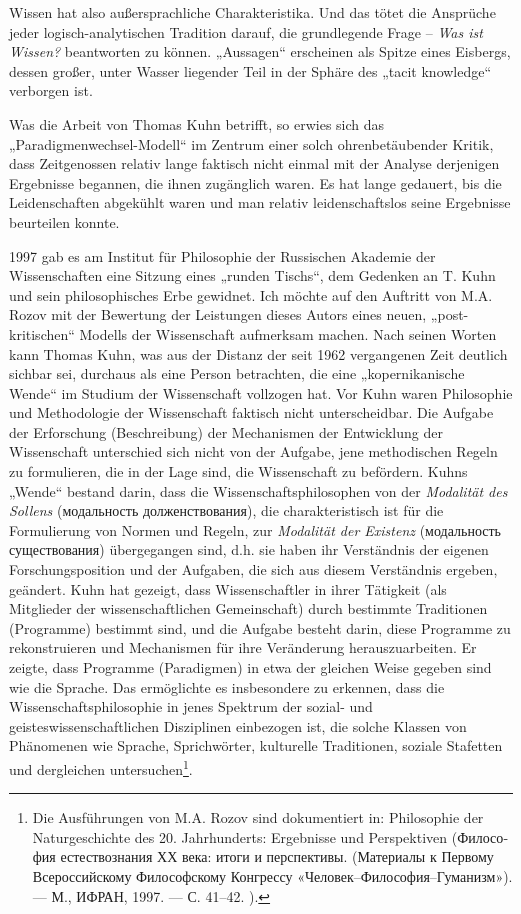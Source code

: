 \documentclass[11pt,a4paper]{article}
\begin{document}
Wissen hat also außersprachliche Charakteristika. Und das tötet die Ansprüche
jeder logisch-analytischen Tradition darauf, die grundlegende Frage --
\emph{Was ist Wissen?} beantworten zu können.  „Aussagen“ erscheinen als
Spitze eines Eisbergs, dessen großer, unter Wasser liegender Teil in der
Sphäre des „tacit knowledge“ verborgen ist.

Was die Arbeit von Thomas Kuhn betrifft, so erwies sich das
„Paradigmenwechsel-Modell“ im Zentrum einer solch ohrenbetäubender Kritik,
dass Zeitgenossen relativ lange faktisch nicht einmal mit der Analyse
derjenigen Ergebnisse begannen, die ihnen zugänglich waren.  Es hat lange
gedauert, bis die Leidenschaften abgekühlt waren und man relativ
leidenschaftslos seine Ergebnisse beurteilen konnte.

1997 gab es am Institut für Philosophie der Russischen Akademie der
Wissenschaften eine Sitzung eines „runden Tischs“, dem Gedenken an T. Kuhn und
sein philosophisches Erbe gewidnet. Ich möchte auf den Auftritt von M.A. Rozov
mit der Bewertung der Leistungen dieses Autors eines neuen, „post-kritischen“
Modells der Wissenschaft aufmerksam machen. Nach seinen Worten kann Thomas
Kuhn, was aus der Distanz der seit 1962 vergangenen Zeit deutlich sichbar sei,
durchaus als eine Person betrachten, die eine „kopernikanische Wende“ im
Studium der Wissenschaft vollzogen hat. Vor Kuhn waren Philosophie und
Methodologie der Wissenschaft faktisch nicht unterscheidbar. Die Aufgabe der
Erforschung (Beschreibung) der Mechanismen der Entwicklung der Wissenschaft
unterschied sich nicht von der Aufgabe, jene methodischen Regeln zu
formulieren, die in der Lage sind, die Wissenschaft zu befördern. Kuhns
„Wende“ bestand darin, dass die Wissenschaftsphilosophen von der
\emph{Modalität des Sollens} (\foreignlanguage{russian}{модальность
  долженствования}), die charakteristisch ist für die Formulierung von Normen
und Regeln, zur \emph{Modalität der Existenz}
(\foreignlanguage{russian}{модальность существования}) übergegangen sind,
d.h. sie haben ihr Verständnis der eigenen Forschungsposition und der
Aufgaben, die sich aus diesem Verständnis ergeben, geändert. Kuhn hat gezeigt,
dass Wissenschaftler in ihrer Tätigkeit (als Mitglieder der wissenschaftlichen
Gemeinschaft) durch bestimmte Traditionen (Programme) bestimmt sind, und die
Aufgabe besteht darin, diese Programme zu rekonstruieren und Mechanismen für
ihre Veränderung herauszuarbeiten. Er zeigte, dass Programme (Paradigmen) in
etwa der gleichen Weise gegeben sind wie die Sprache. Das ermöglichte es
insbesondere zu erkennen, dass die Wissenschaftsphilosophie in jenes Spektrum
der sozial- und geisteswissenschaftlichen Disziplinen einbezogen ist, die
solche Klassen von Phänomenen wie Sprache, Sprichwörter, kulturelle
Traditionen, soziale Stafetten und dergleichen untersuchen\footnote{Die
  Ausführungen von M.A. Rozov sind dokumentiert in: Philosophie der
  Naturgeschichte des 20. Jahrhunderts: Ergebnisse und Perspektiven
  (\foreignlanguage{russian}{Философия естествознания ХХ века: итоги и
    перспективы. (Материалы к Первому Всероссийскому Философскому Конгрессу
    «Человек–Философия–Гуманизм»). — М., ИФРАН, 1997. — С. 41–42.  }).}.
\end{document}
